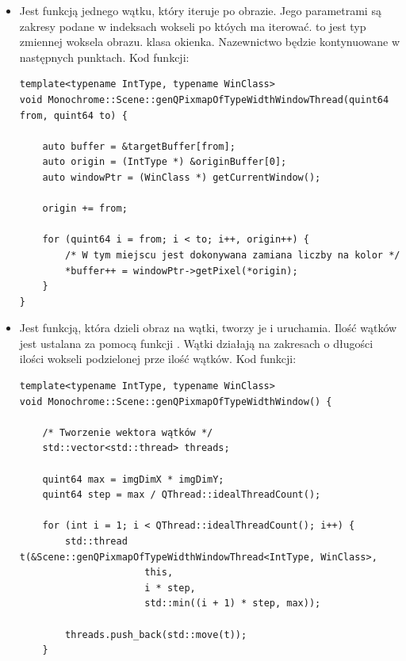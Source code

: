 \begin{itemize}
    \item {}

          Jest funkcją jednego wątku, który iteruje po obrazie.
          Jego parametrami są zakresy podane w indeksach wokseli po któych ma iterować.
           to jest typ zmiennej woksela obrazu.
           klasa okienka.
          Nazewnictwo będzie kontynuowane w następnych punktach.
          Kod funkcji:
          \begin{lstlisting}
template<typename IntType, typename WinClass>
void Monochrome::Scene::genQPixmapOfTypeWidthWindowThread(quint64 from, quint64 to) {

    auto buffer = &targetBuffer[from];
    auto origin = (IntType *) &originBuffer[0];
    auto windowPtr = (WinClass *) getCurrentWindow();

    origin += from;

    for (quint64 i = from; i < to; i++, origin++) {
        /* W tym miejscu jest dokonywana zamiana liczby na kolor */
        *buffer++ = windowPtr->getPixel(*origin);
    }
}
\end{lstlisting}

    \item {}

          Jest funkcją, która dzieli obraz na wątki, tworzy je i uruchamia.
          Ilość wątków jest ustalana za pomocą funkcji .
          Wątki działają na zakresach o długości ilości wokseli podzielonej prze ilość wątków.
          Kod funkcji:
          \begin{lstlisting}
template<typename IntType, typename WinClass>
void Monochrome::Scene::genQPixmapOfTypeWidthWindow() {

    /* Tworzenie wektora wątków */
    std::vector<std::thread> threads;

    quint64 max = imgDimX * imgDimY;
    quint64 step = max / QThread::idealThreadCount();

    for (int i = 1; i < QThread::idealThreadCount(); i++) {
        std::thread t(&Scene::genQPixmapOfTypeWidthWindowThread<IntType, WinClass>,
                      this,
                      i * step,
                      std::min((i + 1) * step, max));

        threads.push_back(std::move(t));
    }


\end{lstlisting}
\end{itemize}
